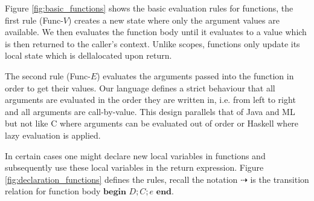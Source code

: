 \documentclass[a4paper,12pt]{report}
\begin{document}
\par
Figure \ref{fig:basic_functions} shows the basic evaluation rules for functions,  
the first rule (Func-$V$) creates a new state where only 
the argument values are available. We then evaluates the function body until it 
evaluates to a value which is then returned to the caller's context. Unlike 
scopes, functions only update its local state which is dellalocated upon return.

\par
The second rule (Func-$E$) evaluates the arguments passed into the 
function in order to get their values. Our language defines a strict 
behaviour that all arguments are evaluated in the order they are written in, 
i.e. from left to right and all arguments are call-by-value. This design parallels 
that of Java and ML but not like C where arguments can be evaluated out of order 
or Haskell where lazy evaluation is applied. 

\par
In certain cases one might declare new local variables in functions and 
subsequently use these local variables in the return expression. Figure 
\ref{fig:declaration_functions} defines the rules, recall the 
notation $\dashrightarrow$ is the transition relation for function body 
$\textbf{begin }D;C;e\textbf{ end}$.
\end{document}

